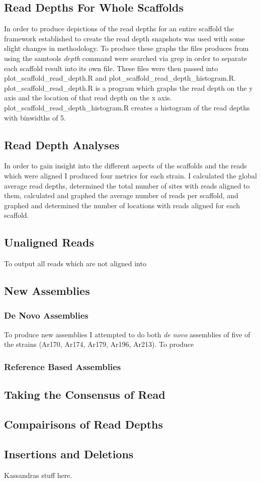 \documentclass[../main.tex]{subfiles}
\begin{document}
\subsection{Read Depths For Whole Scaffolds}
	In order to produce depictions of the read depths for an entire scaffold the framework established to create the read depth snapshots was used with some slight changes in methodology. To produce these graphs the files produces from using the samtools \textit{depth} command were searched via grep in order to separate each scaffold result into its own file. These files were then passed into plot\_scaffold\_read\_depth.R and plot\_scaffold\_read\_depth\_histogram.R. plot\_scaffold\_read\_depth.R is a program which graphs the read depth on the y axis and the location of that read depth on the x axis. plot\_scaffold\_read\_depth\_histogram.R creates a histogram of the read depths with binwidths of 5. %

\subsection{Read Depth Analyses}
	In order to gain insight into the different aspects of the scaffolds and the reads which were aligned I produced four metrics for each strain. I calculated the global average read depths, determined the total number of sites with reads aligned to them, calculated and graphed the average number of reads per scaffold, and graphed and determined the number of locations with reads aligned for each scaffold. 

\subsection{Unaligned Reads}
	To output all reads which are not aligned into 
\subsection{New Assemblies}
	\subsubsection{De Novo Assemblies}
	To produce new assemblies I attempted to do both \textit{de novo} assemblies of five of the strains (Ar170, Ar174, Ar179, Ar196, Ar213). To produce 
	\subsubsection{Reference Based Assemblies}


\subsection{Taking the Consensus of Read}

\subsection{Compairisons of Read Depths}

\subsection{Insertions and Deletions}

	Kassandras stuff here.
\end{document}
